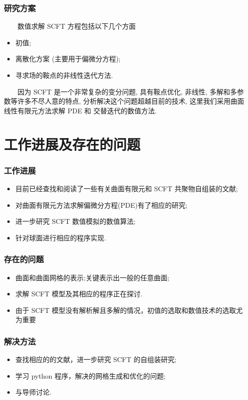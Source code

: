 \documentclass[notheorems,serif]{beamer}
\begin{document}
\begin{frame}
    \frametitle{研究方案}
~~~~数值求解 SCFT 方程包括以下几个方面

    \begin{itemize}
	\item 初值;
        \item 离散化方案 (主要用于偏微分方程);
	\item 寻求场的鞍点的非线性迭代方法.
    \end{itemize}

\vspace{0.5cm}
~~~~因为 SCFT 是一个非常复杂的变分问题, 具有鞍点优化, 非线性, 多解和多参数等许多不尽人意的特点, 分析解决这个问题超越目前的技术, 这里我们采用曲面线性有限元方法求解 PDE 和 交替迭代的数值方法.

\end{frame}

\section{工作进展及存在的问题}

\begin{frame}
    \frametitle{工作进展}
    \begin{itemize}
        \item 目前已经查找和阅读了一些有关曲面有限元和 SCFT 共聚物自组装的文献;
        \item 对曲面有限元方法求解偏微分方程(PDE)有了相应的研究;
        \item 进一步研究 SCFT 数值模拟的数值算法;
        \item 针对球面进行相应的程序实现.  
    \end{itemize}
\end{frame}


\begin{frame}
    \frametitle{存在的问题}
    \begin{itemize}
        \item 曲面和曲面网格的表示;关键表示出一般的任意曲面;
        \item 求解 SCFT 模型及其相应的程序正在探讨.
        \item 由于 SCFT 模型没有解析解且多解的情况，初值的选取和数值技术的选取尤为重要
    \end{itemize}
\end{frame}


\begin{frame}
    \frametitle{解决方法}
    \begin{itemize}
        \item 查找相应的的文献，进一步研究 SCFT 的自组装研究;
        \item 学习 python 程序，解决的网格生成和优化的问题;
        \item 与导师讨论.
    \end{itemize}
\end{frame}
\end{document}
